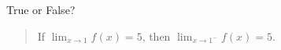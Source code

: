 \documentclass{ximera}
\author{Gregory Hartman \and Matthew Carr}
\begin{document}
\begin{exercise}



True or False?
\begin{quote}
If $\lim_{x\to1}f(x)=5$, then $\lim_{x\to1^{-}}f(x)=5$.
\end{quote}

\begin{prompt}
\begin{multipleChoice}
\end{multipleChoice}
\end{prompt}

\end{exercise}
\end{document}
